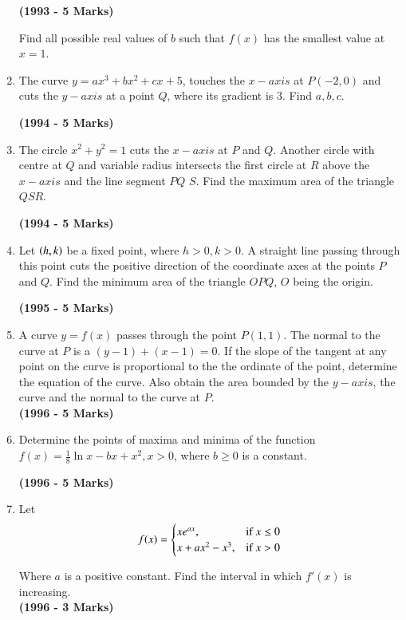 \documentclass[journal,12pt,twocolumn]{IEEEtran}
\theoremstyle{remark}
\begin{document}
\begin{enumerate}
\hfill{\textbf{(1993 - 5 Marks)}}

Find all possible real values of $b$ such that $f(x)$ has the smallest value at $x=1$.

\item The curve $y = ax^3 + bx^2 + cx + 5$, touches the $x-axis$ at $P(-2,0)$ and cuts the $y-axis$ at a point $Q$, where its gradient is 3. Find $a, b, c$.

\hfill{\textbf{(1994 - 5 Marks)}}

\item The circle $x^2 + y^2 = 1$ cuts the $x-axis$ at $P$ and $Q$. Another circle with centre at $Q$ and variable radius intersects the first circle at $R$ above the $x-axis$ and the line segment $PQ$ $S$. Find the maximum area of the triangle $QSR$.

\hfill{\textbf{(1994 - 5 Marks)}}


\item Let $\left(h,k\right)$ be a fixed point, where $h>0, k>0$. A straight line passing through this point cuts the positive direction of the coordinate axes at the points $P$ and $Q$. Find the minimum area of the triangle $OPQ$, $O$ being the origin.

\hfill{\textbf{(1995 - 5 Marks)}}


\item A curve $y=f(x)$ passes through the point $P(1,1)$. The normal to the curve at $P$ is a $(y-1) + (x-1) = 0$. If the slope of the tangent at any point on the curve is proportional to the the ordinate of the point, determine the equation of the curve. Also obtain the area bounded by the $y-axis$, the curve and the normal to the curve at $P$.\\
\hfill{\textbf{(1996 - 5 Marks)}}

\item Determine the points of maxima and minima of the function $f(x) = \frac{1}{8}\ln{x} - bx + x^2, x>0$, where $b \geq 0$ is a constant.

\hfill{\textbf{(1996 - 5 Marks)}}


\item Let 
\[ f(x) = \begin{cases}
xe^{ax}, & \text{if } x \leq 0\\
x+ax^2 - x^3, & \text{if } x > 0
\end{cases}\\
\]

Where $a$ is a positive constant. Find the interval in which $f'(x)$ is increasing.\\
\hfill{\textbf{(1996 - 3 Marks)}}


\end{enumerate}
\end{document}
